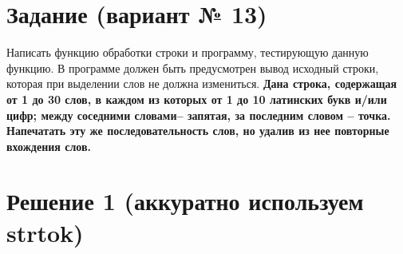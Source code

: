 \documentclass[12pt]{article}
\begin{document}
	\newpage
	
	
	\section*{Задание (вариант № 13)}
	
 	Написать функцию обработки строки и программу, тестирующую данную функцию. В программе должен быть предусмотрен вывод исходный строки, которая при выделении слов не должна измениться.
 	\vspace{5pt}
	\newline
	\textbf{Дана строка, содержащая от 1 до 30 слов, в каждом из которых от 1 до 10 латинских букв и/или цифр; между соседними словами-- запятая, за последним словом -- точка. Напечатать эту же последовательность слов, но удалив из нее повторные вхождения слов.}
	
	\newpage
	
	\section*{Решение 1 (аккуратно используем strtok)}
	
\end{document}
